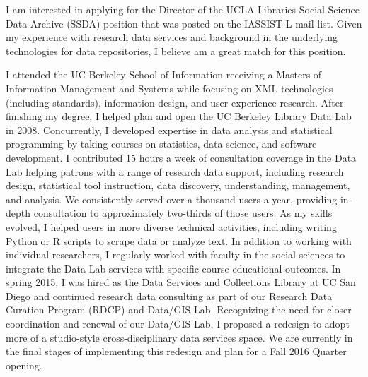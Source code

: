 \documentclass[11pt,letterpaper,sans]{moderncv}
\begin{document}
I am interested in applying for the Director of the UCLA Libraries Social Science Data Archive (SSDA) position that was posted on the IASSIST-L mail list. Given my experience with research data services and background in the underlying technologies for data repositories, I believe am a great match for this position.

I attended the UC Berkeley School of Information receiving a Masters of Information Management and Systems while focusing on XML technologies (including standards), information design, and user experience research. After finishing my degree, I helped plan and open the UC Berkeley Library Data Lab in 2008. Concurrently, I developed expertise in data analysis and statistical programming by taking courses on statistics, data science, and software development. I contributed 15 hours a week of consultation coverage in the Data Lab helping patrons with a range of research data support, including research design, statistical tool instruction, data discovery, understanding, management, and analysis. We consistently served over a thousand users a year, providing in-depth consultation to approximately two-thirds of those users. As my skills evolved, I helped users in more diverse technical activities, including writing Python or R scripts to scrape data or analyze text.  In addition to working with individual researchers, I regularly worked with faculty in the social sciences to integrate the Data Lab services with specific course educational outcomes. In spring 2015, I was hired as the Data Services and Collections Library at UC San Diego and continued research data consulting as part of our Research Data Curation Program (RDCP) and Data/GIS Lab. Recognizing the need for closer coordination and renewal of our Data/GIS Lab, I proposed a redesign to adopt more of a studio-style cross-disciplinary data services space. We are currently in the final stages of implementing this redesign and plan for a Fall 2016 Quarter opening. 
\end{document}
